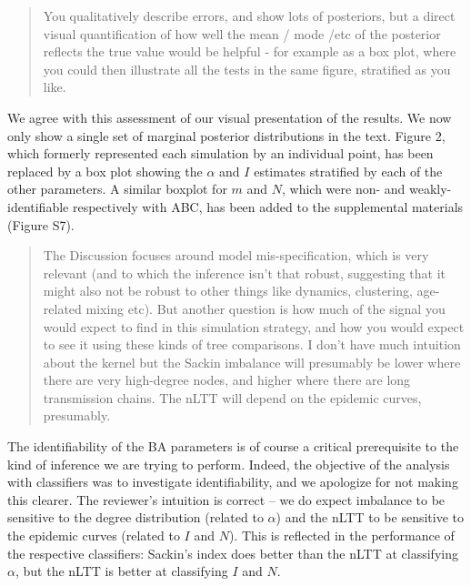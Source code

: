 \documentclass[12pt]{letter}
\begin{document}
\begin{letter}{ }
\begin{quote}
  \itshape

  You qualitatively describe errors, and show lots of posteriors, but a direct
  visual quantification of how well the mean / mode /etc of the posterior
  reflects the true value would be helpful - for example as a box plot, where
  you could then illustrate all the tests in the same figure, stratified as you
  like.
\end{quote}

We agree with this assessment of our visual presentation of the results. We
now only show a single set of marginal posterior distributions in the text.
Figure 2, which formerly represented each simulation by an individual point,
has been replaced by a box plot showing the $\alpha$ and $I$ estimates
stratified by each of the other parameters. A similar boxplot for $m$ and $N$,
which were non- and weakly-identifiable respectively with ABC, has been added
to the supplemental materials (Figure S7).

\begin{quote}
  \itshape

  The Discussion focuses around model mis-specification, which is very
  relevant (and to which the inference isn't that robust, suggesting that it
  might also not be robust to other things like dynamics, clustering,
  age-related mixing etc). But another question is how much of the signal you
  would expect to find in this simulation strategy, and how you would expect to
  see it using these kinds of tree comparisons. I don't have much intuition
  about the kernel but the Sackin imbalance will presumably be lower where
  there are very high-degree nodes, and higher where there are long
  transmission chains. The nLTT will depend on the epidemic curves, presumably.
\end{quote}

The identifiability of the BA parameters is of course a critical prerequisite
to the kind of inference we are trying to perform. Indeed, the objective of the 
analysis with classifiers was to investigate identifiability, and we apologize
for not making this clearer. The reviewer's intuition is correct -- we do
expect imbalance to be sensitive to the degree distribution (related to
$\alpha$) and the nLTT to be sensitive to the epidemic curves (related to $I$
and $N$). This is reflected in the performance of the respective classifiers:
Sackin's index does better than the nLTT at classifying $\alpha$, but the nLTT
is better at classifying $I$ and $N$.


\end{letter}
\end{document}
